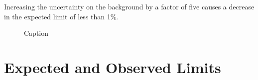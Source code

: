 Increasing the uncertainty on the background by a factor of five causes a
decrease in the expected limit of less than 1\%.

\begin{figure}[htbp]
\begin{center}
\caption{
\small
Caption
 }
\label{fig:TGC-binOpt}
\end{center}
\end{figure}

\section{Expected and Observed Limits}


